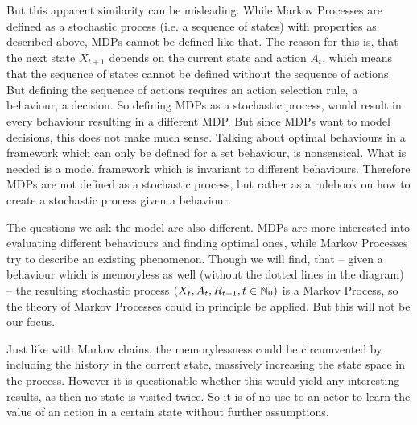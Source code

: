 But this apparent similarity can be misleading. While Markov Processes are defined as a stochastic process (i.e. a sequence of states) with properties as described above, MDPs cannot be defined like that. The reason for this is, that the next state \(X_{t+1}\) depends on the current state and action \(A_{t}\), which means that the sequence of states cannot be defined without the sequence of actions. But defining the sequence of actions requires an action selection rule, a behaviour, a decision. So defining MDPs as a stochastic process, would result in every behaviour resulting in a different MDP. But since MDPs want to model decisions, this does not make much sense. Talking about optimal behaviours in a framework which can only be defined for a set behaviour, is nonsensical. What is needed is a model framework which is invariant to different behaviours. Therefore MDPs are not defined as a stochastic process, but rather as a rulebook on how to create a stochastic process given a behaviour. 

The questions we ask the model are also different.  MDPs are more interested into evaluating different behaviours and finding optimal ones, while Markov Processes try to describe an existing phenomenon. Though we will find, that -- given a behaviour which is memoryless as well (without the dotted lines in the diagram) -- the resulting stochastic process \((X_t,A_t,R_{t+1},t\in\mathbb{N}_0)\) is a Markov Process, so the theory of Markov Processes could in principle be applied. But this will not be our focus. 

Just like with Markov chains, the memorylessness could be circumvented by including the history in the current state, massively increasing the state space in the process. However it is questionable whether this would yield any interesting results, as then no state is visited twice. So it is of no use to an actor to learn the value of an action in a certain state without further assumptions.


